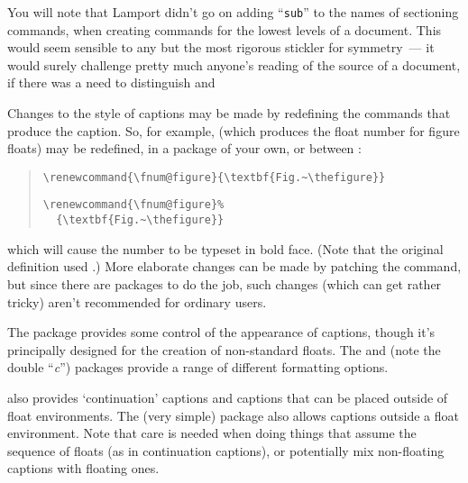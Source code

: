 You will note that Lamport didn't go on adding ``\texttt{sub}'' to the
names of sectioning commands, when creating commands for the lowest
levels of a document.  This would seem sensible to any but the most
rigorous stickler for symmetry~--- it would surely challenge pretty
much anyone's reading of the source of a document, if there was a need
to distinguish  and 
\begin{ctanrefs}
\item[\nothtml{\rmfamily}\LaTeX{} source]
\item[titlesec.sty]
\end{ctanrefs}


Changes to the style of captions may be made by redefining the commands
that produce the caption.  So, for example,  (which
produces the float number for figure floats) may be redefined, in a
package of your own, or between
:
\begin{quote}
\begin{wideversion}
\begin{verbatim}
\renewcommand{\fnum@figure}{\textbf{Fig.~\thefigure}}
\end{verbatim}
\end{wideversion}
\begin{narrowversion}
\begin{verbatim}
\renewcommand{\fnum@figure}%
  {\textbf{Fig.~\thefigure}}
\end{verbatim}
\end{narrowversion}
\end{quote}
which will cause the number to be typeset in bold face.  (Note that
the original definition used %
.)  More elaborate changes can be
made by patching the  command, but since there are
packages to do the job, such changes (which can get rather tricky)
aren't recommended for ordinary users.

The  package provides some control of the appearance of
captions, though it's principally designed for the creation of
non-standard floats.  The  and 
(note the double ``\emph{c}'') packages provide a range of different
formatting options.

 also provides `continuation' captions and captions
that can be placed outside of float environments.  The (very simple)
 package also allows captions outside a float
environment.  Note that care is needed when doing things that assume
the sequence of floats (as in continuation captions), or potentially
mix non-floating captions with floating ones.

